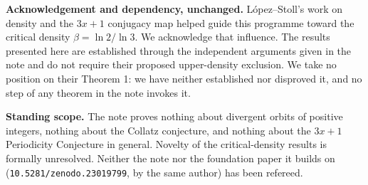 \documentclass[11pt]{article}
\begin{document}
\medskip

\noindent\textbf{Acknowledgement and dependency, unchanged.} L\'opez--Stoll's work on density and the
$3x+1$ conjugacy map helped guide this programme toward the critical density $\beta=\ln2/\ln3$. We
acknowledge that influence. The results presented here are established through the independent
arguments given in the note and do not require their proposed upper-density exclusion. We take no
position on their Theorem 1: we have neither established nor disproved it, and no step of any theorem
in the note invokes it.

\medskip

\noindent\textbf{Standing scope.} The note proves nothing about divergent orbits of positive
integers, nothing about the Collatz conjecture, and nothing about the $3x+1$ Periodicity Conjecture
in general. Novelty of the critical-density results is formally unresolved. Neither the note nor the
foundation paper it builds on (\texttt{10.5281/zenodo.23019799}, by the same author) has been
refereed.
\end{document}
